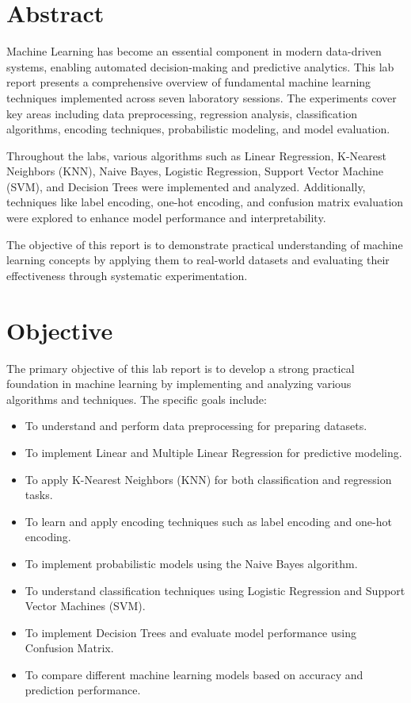 \documentclass[11pt,a4paper]{report}
\begin{document}
    
\tableofcontents
\thispagestyle{empty}
\clearpage
{}
\rfoot{\thepage}
\chapter*{\center Abstract}

Machine Learning has become an essential component in modern data-driven systems, enabling automated decision-making and predictive analytics. This lab report presents a comprehensive overview of fundamental machine learning techniques implemented across seven laboratory sessions. The experiments cover key areas including data preprocessing, regression analysis, classification algorithms, encoding techniques, probabilistic modeling, and model evaluation.

Throughout the labs, various algorithms such as Linear Regression, K-Nearest Neighbors (KNN), Naive Bayes, Logistic Regression, Support Vector Machine (SVM), and Decision Trees were implemented and analyzed. Additionally, techniques like label encoding, one-hot encoding, and confusion matrix evaluation were explored to enhance model performance and interpretability.

The objective of this report is to demonstrate practical understanding of machine learning concepts by applying them to real-world datasets and evaluating their effectiveness through systematic experimentation.

\chapter*{\center Objective}

The primary objective of this lab report is to develop a strong practical foundation in machine learning by implementing and analyzing various algorithms and techniques. The specific goals include:

\begin{itemize}
    \item To understand and perform data preprocessing for preparing datasets.
    \item To implement Linear and Multiple Linear Regression for predictive modeling.
    \item To apply K-Nearest Neighbors (KNN) for both classification and regression tasks.
    \item To learn and apply encoding techniques such as label encoding and one-hot encoding.
    \item To implement probabilistic models using the Naive Bayes algorithm.
    \item To understand classification techniques using Logistic Regression and Support Vector Machines (SVM).
    \item To implement Decision Trees and evaluate model performance using Confusion Matrix.
    \item To compare different machine learning models based on accuracy and prediction performance.
\end{itemize}
\end{document}
